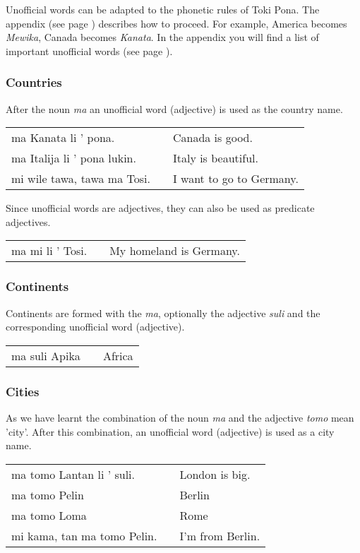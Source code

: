Unofficial words can be adapted to the phonetic rules of Toki Pona.
The appendix (see page \pageref{'phonet_trans'}) describes how to proceed.
For example, America becomes \textit{Mewika}, Canada becomes \textit{Kanata}.
In the appendix you will find a list of important unofficial words (see page \pageref{'unofficial_words'}).

\subsubsection*{Countries}
After the noun \textit{ma} an unofficial word (adjective) is used as the country name.

\begin{supertabular}{p{5,5cm}|ll}
    ma Kanata li ' pona.        &  & Canada is good.          \\
    ma Italija li ' pona lukin. &  & Italy is beautiful.      \\
    mi wile tawa, tawa ma Tosi. &  & I want to go to Germany. \\
\end{supertabular}

Since unofficial words are adjectives, they can also be used as predicate adjectives.

\begin{supertabular}{p{5,5cm}|ll}
    ma mi li ' Tosi. &  & My homeland is Germany. \\
\end{supertabular}

\subsubsection*{Continents}
Continents are formed with the \textit{ma}, optionally the adjective \textit{suli} and the corresponding unofficial word (adjective).

\begin{supertabular}{p{2,5cm}|ll}
    ma suli Apika &  & Africa \\
\end{supertabular}

\subsubsection*{Cities}
As we have learnt the combination of the noun \textit{ma} and the adjective \textit{tomo} mean 'city'.
After this combination, an unofficial word (adjective) is used as a city name.

\begin{supertabular}{p{5,5cm}|ll}
    ma tomo Lantan li ' suli.   &  & London is big.   \\
    ma tomo Pelin               &  & Berlin           \\
    ma tomo Loma                &  & Rome             \\
    mi kama, tan ma tomo Pelin. &  & I'm from Berlin. \\
\end{supertabular}

